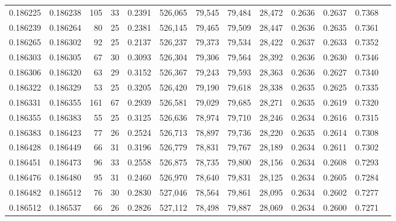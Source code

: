 \begin{tabular}{rrrrrrrrrrrrr}
0.186225 & 0.186238 &   105 &  33 &                                     0.2391 & 526,065 &  79,545 &  79,484 &  28,472 & 0.2636 & 0.2637 & 0.7368 \\
0.186239 & 0.186264 &    80 &  25 &                                     0.2381 & 526,145 &  79,465 &  79,509 &  28,447 & 0.2636 & 0.2635 & 0.7361 \\
0.186265 & 0.186302 &    92 &  25 &                                     0.2137 & 526,237 &  79,373 &  79,534 &  28,422 & 0.2637 & 0.2633 & 0.7352 \\
0.186303 & 0.186305 &    67 &  30 &                                     0.3093 & 526,304 &  79,306 &  79,564 &  28,392 & 0.2636 & 0.2630 & 0.7346 \\
0.186306 & 0.186320 &    63 &  29 &                                     0.3152 & 526,367 &  79,243 &  79,593 &  28,363 & 0.2636 & 0.2627 & 0.7340 \\
0.186322 & 0.186329 &    53 &  25 &                                     0.3205 & 526,420 &  79,190 &  79,618 &  28,338 & 0.2635 & 0.2625 & 0.7335 \\
0.186331 & 0.186355 &   161 &  67 &                                     0.2939 & 526,581 &  79,029 &  79,685 &  28,271 & 0.2635 & 0.2619 & 0.7320 \\
0.186355 & 0.186383 &    55 &  25 &                                     0.3125 & 526,636 &  78,974 &  79,710 &  28,246 & 0.2634 & 0.2616 & 0.7315 \\
0.186383 & 0.186423 &    77 &  26 &                                     0.2524 & 526,713 &  78,897 &  79,736 &  28,220 & 0.2635 & 0.2614 & 0.7308 \\
0.186428 & 0.186449 &    66 &  31 &                                     0.3196 & 526,779 &  78,831 &  79,767 &  28,189 & 0.2634 & 0.2611 & 0.7302 \\
0.186451 & 0.186473 &    96 &  33 &                                     0.2558 & 526,875 &  78,735 &  79,800 &  28,156 & 0.2634 & 0.2608 & 0.7293 \\
0.186476 & 0.186480 &    95 &  31 &                                     0.2460 & 526,970 &  78,640 &  79,831 &  28,125 & 0.2634 & 0.2605 & 0.7284 \\
0.186482 & 0.186512 &    76 &  30 &                                     0.2830 & 527,046 &  78,564 &  79,861 &  28,095 & 0.2634 & 0.2602 & 0.7277 \\
0.186512 & 0.186537 &    66 &  26 &                                     0.2826 & 527,112 &  78,498 &  79,887 &  28,069 & 0.2634 & 0.2600 & 0.7271 \\

\end{tabular}
